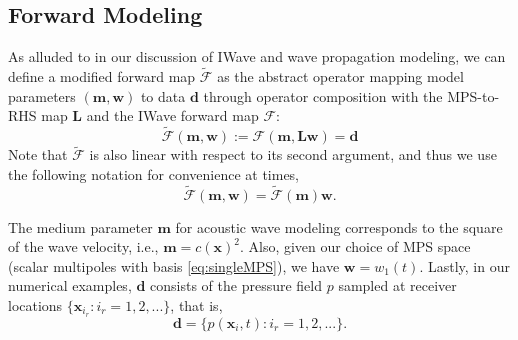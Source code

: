 \subsection{Forward Modeling}

As alluded to in our discussion of IWave and wave propagation modeling, we can define a modified forward map $\tilde{\mathcal F}$ as the abstract operator mapping model parameters $(\mathbf m,\mathbf w)$ to data $\mathbf d$ through operator composition with the MPS-to-RHS map $\mathbf L$ and the IWave forward map $\mathcal F$:
\begin{equation}\label{eq:Fmap}
	\tilde{\mathcal F}(\mathbf m,\mathbf w) := \mathcal F(\mathbf m,\mathbf L\mathbf w) = \mathbf d
\end{equation}
Note that $\tilde{\mathcal F}$ is also linear with respect to its second argument, and thus we use the following notation for convenience at times,
\begin{equation}\label{eq:F_lin}
	\tilde{\mathcal F}(\mathbf m,\mathbf w) = \tilde{\mathcal F}(\mathbf m)\mathbf w.
\end{equation}

The medium parameter $\mathbf m$ for acoustic wave modeling corresponds to the square of the wave velocity, i.e., $\mathbf m = c(\mathbf x)^2$.
Also, given our choice of MPS space (scalar multipoles with basis \ref{eq:singleMPS}), we have $\mathbf w=w_1(t)$.
Lastly, in our numerical examples, $\mathbf d$ consists of the pressure field $p$ sampled at receiver locations $\{\mathbf x_{i_r} : i_r=1,2,...\}$, that is,
\[
	\mathbf d = \{ p(\mathbf x_i,t) : i_r=1,2,...\}.
\]

